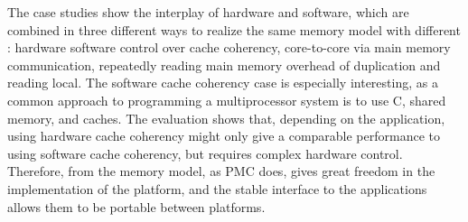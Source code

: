 The case studies show the interplay of hardware and software, which are combined in three different ways to realize the same memory model with different :
hardware \vs software control over cache coherency, core-to-core \vs via main memory communication, repeatedly reading main memory \vs overhead of duplication and reading local.
The software cache coherency case is especially interesting, as a common approach to programming a multiprocessor system is to use C, shared memory, and caches.
The evaluation shows that, depending on the application, using hardware cache coherency might only give a comparable performance to using software cache coherency, but requires complex hardware control.
Therefore,  from the memory model, as \ac{PMC} does, gives great freedom in the implementation of the platform, and the stable interface to the applications allows them to be portable between platforms.

